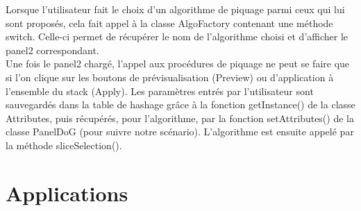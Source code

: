 Lorsque l'utilisateur fait le choix d'un algorithme de piquage parmi ceux qui lui sont proposés, cela fait appel à la classe AlgoFactory contenant une méthode switch. Celle-ci permet de récupérer le nom de l'algorithme choisi et d'afficher le panel2 correspondant. \\
Une fois le panel2 chargé, l'appel aux procédures de piquage ne peut se faire que si l'on clique sur les boutons de prévisualisation (Preview) ou d'application à l'ensemble du stack (Apply). Les paramètres entrés par l'utilisateur sont sauvegardés dans la table de hashage grâce à la fonction getInstance() de la classe Attributes, puis récupérés, pour l'algorithme, par la fonction setAttributes() de la classe PanelDoG (pour suivre notre scénario). L'algorithme est ensuite appelé par la méthode sliceSelection(). 










\section{Applications}

